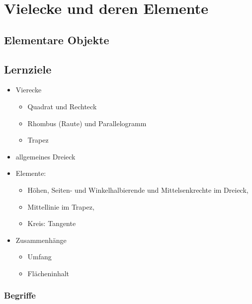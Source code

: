 \section{Vielecke und deren Elemente}



\subsection{Elementare Objekte}

\subsection*{Lernziele}

\begin{itemize}
\item Vierecke
  \begin{itemize}
  \item Quadrat und Rechteck
  \item Rhombus (Raute) und Parallelogramm
  \item Trapez
  \end{itemize}
\item allgemeines Dreieck

\item Elemente:
  \begin{itemize}
  \item Höhen, Seiten- und Winkelhalbierende und
    Mittelsenkrechte im Dreieck,
  \item Mittellinie im Trapez,
  \item Kreis: Tangente
  \end{itemize}
\item Zusammenhänge
  \begin{itemize}
  \item
    Umfang
  \item
    Flächeninhalt 
  \end{itemize}

\end{itemize}

\newpage
\subsubsection{Begriffe}

